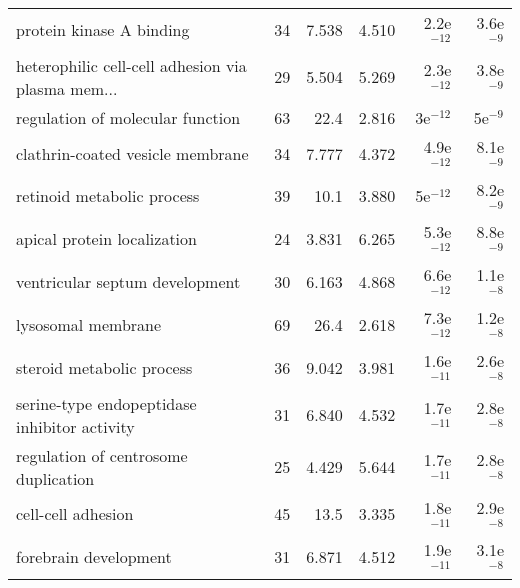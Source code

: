 \begin{longtable}{lrrrrr}
                          protein kinase A binding &                      34 &                   7.538 &      4.510 &         2.2e$^{-12}$ &          3.6e$^{-9}$ \\
 heterophilic cell-cell adhesion via plasma mem... &                      29 &                   5.504 &      5.269 &         2.3e$^{-12}$ &          3.8e$^{-9}$ \\
                  regulation of molecular function &                      63 &                    22.4 &      2.816 &           3e$^{-12}$ &            5e$^{-9}$ \\
                  clathrin-coated vesicle membrane &                      34 &                   7.777 &      4.372 &         4.9e$^{-12}$ &          8.1e$^{-9}$ \\
                        retinoid metabolic process &                      39 &                    10.1 &      3.880 &           5e$^{-12}$ &          8.2e$^{-9}$ \\
                       apical protein localization &                      24 &                   3.831 &      6.265 &         5.3e$^{-12}$ &          8.8e$^{-9}$ \\
                    ventricular septum development &                      30 &                   6.163 &      4.868 &         6.6e$^{-12}$ &          1.1e$^{-8}$ \\
                                lysosomal membrane &                      69 &                    26.4 &      2.618 &         7.3e$^{-12}$ &          1.2e$^{-8}$ \\
                         steroid metabolic process &                      36 &                   9.042 &      3.981 &         1.6e$^{-11}$ &          2.6e$^{-8}$ \\
      serine-type endopeptidase inhibitor activity &                      31 &                   6.840 &      4.532 &         1.7e$^{-11}$ &          2.8e$^{-8}$ \\
              regulation of centrosome duplication &                      25 &                   4.429 &      5.644 &         1.7e$^{-11}$ &          2.8e$^{-8}$ \\
                                cell-cell adhesion &                      45 &                    13.5 &      3.335 &         1.8e$^{-11}$ &          2.9e$^{-8}$ \\
                             forebrain development &                      31 &                   6.871 &      4.512 &         1.9e$^{-11}$ &          3.1e$^{-8}$ \\

\end{longtable}
